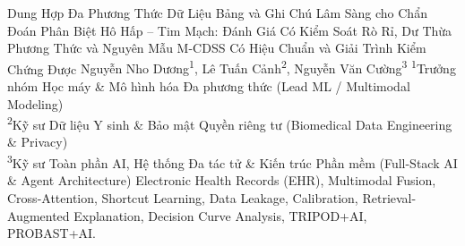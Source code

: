 \documentclass[11pt,a4paper]{article}
\begin{document}
\mcdsstitle
    {Dung Hợp Đa Phương Thức Dữ Liệu Bảng và Ghi Chú Lâm Sàng cho Chẩn Đoán Phân Biệt Hô Hấp -- Tim Mạch: Đánh Giá Có Kiểm Soát Rò Rỉ, Dư Thừa Phương Thức và Nguyên Mẫu M-CDSS Có Hiệu Chuẩn và Giải Trình Kiểm Chứng Được}
    {Nguyễn Nho Dương\textsuperscript{1}, Lê Tuấn Cảnh\textsuperscript{2}, Nguyễn Văn Cường\textsuperscript{3}}
    {\textsuperscript{1}Trưởng nhóm Học máy \& Mô hình hóa Đa phương thức (Lead ML / Multimodal Modeling) \\
     \textsuperscript{2}Kỹ sư Dữ liệu Y sinh \& Bảo mật Quyền riêng tư (Biomedical Data Engineering \& Privacy) \\
     \textsuperscript{3}Kỹ sư Toàn phần AI, Hệ thống Đa tác tử \& Kiến trúc Phần mềm (Full-Stack AI \& Agent Architecture)}
    {Electronic Health Records (EHR), Multimodal Fusion, Cross-Attention, Shortcut Learning, Data Leakage, Calibration, Retrieval-Augmented Explanation, Decision Curve Analysis, TRIPOD+AI, PROBAST+AI.}










\end{document}
